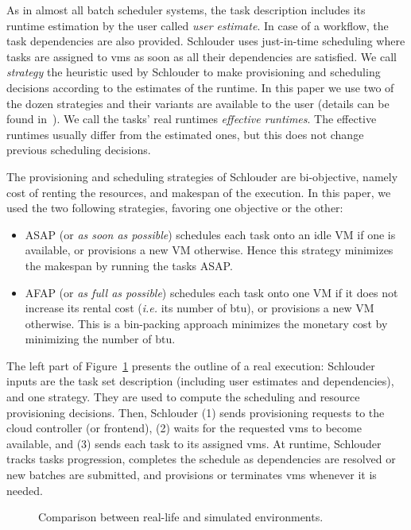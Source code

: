 \documentclass[]{llncs}
\begin{document}
As  in almost  all batch  scheduler systems,  the task description includes  its
runtime  estimation by  the  user called  \emph{user estimate}.   In  case of  a
workflow, the task dependencies are also provided.   Schlouder uses just-in-time
scheduling where tasks are assigned to \acp{vm} as soon as all their dependencies
are satisfied.  We call \emph{strategy} the  heuristic used by Schlouder to make
provisioning and  scheduling decisions according to the estimates of the runtime.  
In this paper we use two of the dozen strategies and  their variants
are available to  the user (details can be found  in~\cite{GenaudG11}). 
We call  the tasks'  real
runtimes \emph{effective  runtimes}. The effective runtimes usually differ from
the estimated ones, but this does not change previous scheduling decisions.

The provisioning and scheduling strategies of Schlouder are bi-objective, namely  
cost of renting the resources, and makespan of the execution.  In this paper, 
we used the two following strategies, favoring one objective or the other:
\begin{itemize}
\item ASAP (or \textit{as soon as possible}) schedules each task onto
  an idle VM if one is available, or provisions a new VM otherwise.
  Hence this strategy minimizes the makespan by running the tasks ASAP.

\item AFAP (or \textit{as full as  possible}) schedules each task onto
  one VM if it does not increase its rental cost (\textit{i.e.} its number
  of \ac{btu}), or provisions a new VM otherwise. This is a bin-packing approach
  minimizes the monetary cost by minimizing the number of \ac{btu}.
\end{itemize}

The left part  of Figure~\ref{fig:rs} presents the outline of  a real execution:
Schlouder inputs are the task set description (including  user estimates and dependencies),  
and one strategy. They are used to compute   the   scheduling   and  resource   provisioning
decisions. Then, Schlouder (1) sends provisioning requests to the cloud controller (or frontend), 
(2) waits for the requested \acp{vm} to become available, and (3) sends  each
task to  its
assigned \acp{vm}. At runtime, Schlouder tracks tasks progression, completes the schedule as
dependencies are  resolved or new batches are submitted, and provisions or terminates \acp{vm}
whenever it is needed.

\begin{figure}
	\resizebox{\textwidth}{!}{%
		
	}%
	\caption{Comparison between real-life and simulated environments.}\label{fig:rs}
\end{figure}
\end{document}
